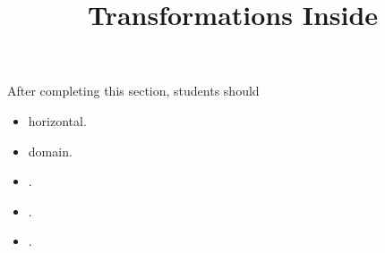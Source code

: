 \documentclass{ximera}
\title{Transformations Inside}
\begin{document}
\begin{abstract}
\end{abstract}
\maketitle

\begin{sectionOutcomes}
After completing this section, students should 

\begin{itemize}
\item horizontal.
\item domain.
\item .
\item .
\item .
\end{itemize}
\end{sectionOutcomes}
\end{document}
